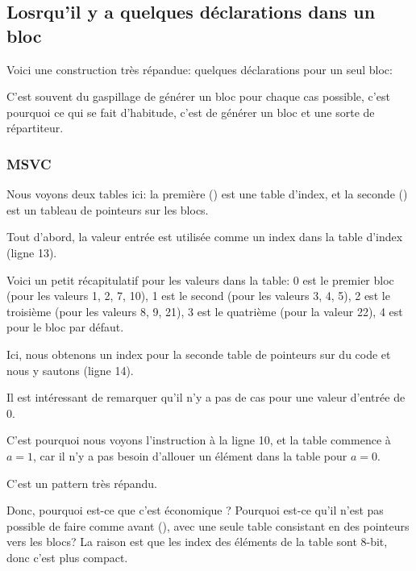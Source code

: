 \subsection{Losrqu'il y a quelques déclarations  dans un bloc}

Voici une construction très répandue: quelques déclarations  pour un seul bloc:



C'est souvent du gaspillage de générer un bloc pour chaque cas possible, c'est
pourquoi ce qui se fait d'habitude, c'est de générer un bloc et une sorte de répartiteur.

\subsubsection{MSVC}



Nous voyons deux tables ici: la première () est une table d'index,
et la seconde () est un tableau de pointeurs sur les blocs.

Tout d'abord, la valeur entrée est utilisée comme un index dans la table d'index
(ligne 13).

Voici un petit récapitulatif pour les valeurs dans la table:
0 est le premier bloc  (pour les valeurs 1, 2, 7, 10),
1 est le second (pour les valeurs 3, 4, 5),
2 est le troisième (pour les valeurs 8, 9, 21),
3 est le quatrième (pour la valeur 22),
4 est pour le bloc par défaut.

Ici, nous obtenons un index pour la seconde table de pointeurs sur du code et nous
y sautons (ligne 14).

Il est intéressant de remarquer qu'il n'y a pas de cas pour une valeur d'entrée
de 0.

C'est pourquoi nous voyons l'instruction \DEC à la ligne 10, et la table commence
à $a=1$, car il n'y a pas besoin d'allouer un élément dans la table pour $a=0$.

C'est un pattern très répandu.

Donc, pourquoi est-ce que c'est économique ?
Pourquoi est-ce qu'il n'est pas possible de faire comme avant (),
avec une seule table consistant en des pointeurs vers les blocs?
La raison est que les index des éléments de la table sont 8-bit, donc c'est plus
compact.

